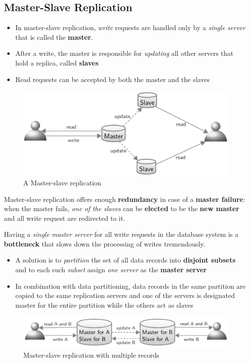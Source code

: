 \subsection{Master-Slave Replication}
\begin{itemize}
    \item In master-slave replication, \textit{write} requests are handled only by a \textit{single server} that is called the \textbf{master}.
    \item After a write, the master is responsible for \textit{updating} all other servers that hold a replica, called \textbf{slaves}
    \item Read requests can be accepted by both the master and the slaves
\end{itemize}
\begin{figure}[!h]
        \centering
        \includegraphics[width=0.8\linewidth]{images/AdvancedDataManagment/replication_and_synchronization/master_slave_replication.jpeg}
        \caption{A Master-slave replication}
    \end{figure}

Master-slave replication offers enough \textbf{redundancy} in case of a \textbf{master failure}: when the master fails, \textit{one of the slaves} can be \textbf{elected} to be the \textbf{new master} and all write request are redirected to it.

Having a \textit{single master server} for all write requests in the database system is a \textbf{bottleneck} that slows down the processing of writes tremendously.
\begin{itemize}
    \item A solution is to \textit{partition} the set of all data records into \textbf{disjoint subsets} and to each such \textit{subset} assign \textit{one server} as the \textbf{master server}
    \item In combination with data partitioning, data records in the same partition are copied to the same replication servers and one of the servers is designated master for the entire partition while the others act as slaves
\end{itemize}
\begin{figure}[!h]
        \centering
        \includegraphics[width=0.8\linewidth]{images/AdvancedDataManagment/replication_and_synchronization/ms_rep_mul_records.jpeg}
        \caption{Master-slave replication with multiple records}
    \end{figure}


